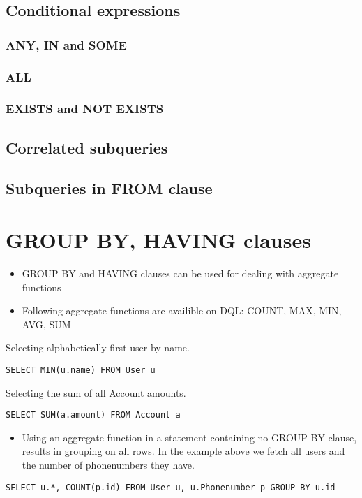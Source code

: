 \documentclass[11pt,a4paper]{report}
\begin{document}
\subsection{Conditional expressions}
\subsubsection{ANY, IN and SOME}
\subsubsection{ALL}
\subsubsection{EXISTS and NOT EXISTS}
\subsection{Correlated subqueries}
\subsection{Subqueries in FROM clause}
\section{GROUP BY, HAVING clauses}
\begin{itemize}
\item{GROUP BY and HAVING clauses can be used for dealing with aggregate functions}
\item{Following aggregate functions are availible on DQL: COUNT, MAX, MIN, AVG, SUM}
\end{itemize}
Selecting alphabetically first user by name.

\begin{verbatim}
SELECT MIN(u.name) FROM User u
\end{verbatim}

Selecting the sum of all Account amounts.

\begin{verbatim}
SELECT SUM(a.amount) FROM Account a
\end{verbatim}

\begin{itemize}
\item{Using an aggregate function in a statement containing no GROUP BY clause, results in grouping on all rows. In the example above we fetch all users and the number of phonenumbers they have.}
\end{itemize}
\begin{verbatim}
SELECT u.*, COUNT(p.id) FROM User u, u.Phonenumber p GROUP BY u.id
\end{verbatim}
\end{document}
